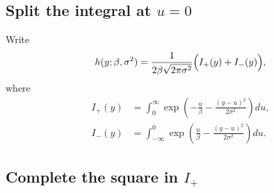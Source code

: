 \documentclass[11pt,a4paper]{article}
\begin{document}
\subsection[Split the integral at u=0]{Split the integral at $u=0$}

Write
\begin{equation}
h(y;\beta,\sigma^2)
=
\frac{1}{2\beta\sqrt{2\pi\sigma^2}} \Bigl(I_+(y)+I_-(y)\Bigr),
\label{eq:h-split}
\end{equation}
where
\begin{align}
I_+(y)
&=
\int_0^{\infty}
\exp\!\left(-\frac{u}{\beta} - \frac{(y-u)^2}{2\sigma^2}\right)du,
\label{eq:Iplus-def}\\[0.3em]
I_-(y)
&=
\int_{-\infty}^{0}
\exp\!\left(\frac{u}{\beta} - \frac{(y-u)^2}{2\sigma^2}\right)du.
\label{eq:Iminus-def}
\end{align}

\subsection[Complete the square in I+]{Complete the square in $I_+$}
\end{document}
